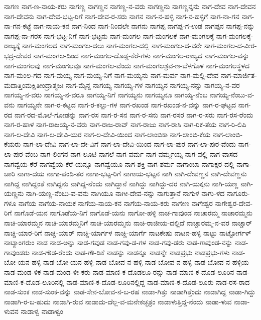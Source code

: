ನಾಗಣ
ನಾಗ-ಣ-ನಾಯ-ಕರು
ನಾಗಣ್ಣ
ನಾಗಣ್ಣನ
ನಾಗಣ್ಣ-ನ-ವರು
ನಾಗಣ್ಣನು
ನಾಗಣ್ಣನ್ನನು
ನಾಗ-ದೇವ
ನಾಗ-ದೇವನ
ನಾಗ-ದೇವನು
ನಾಗ-ದೇವ-ಭಟ್ಟ-ರಿಗೆ
ನಾಗ-ದೇವ-ರ-ಸರು
ನಾಗನ
ನಾಗ-ನ-ಹಳ್ಳಿ
ನಾಗ-ನ-ಹಳ್ಳಿಗೆ
ನಾಗ-ನಾ-ಗನ
ನಾಗ-ನಾ-ಗನ-ಕಟ್ಟೆ
ನಾಗ-ನಾಯ-ಕನ
ನಾಗ-ನಿಂದ
ನಾಗ-ನಿಂದಲೇ
ನಾಗನು
ನಾಗಪ್ಪ
ನಾಗಪ್ಪ-ಗ-ಉಡ
ನಾಗಪ್ಪನ
ನಾಗಪ್ಪ-ನನ್ನು
ನಾಗಪ್ಪ-ನಾ-ಗರಸ
ನಾಗ-ಭಟ್ಟ-ನಿಗೆ
ನಾಗ-ಭಟ್ಟನು
ನಾಗ-ಮಂಗಲ
ನಾಗ-ಮಂಗಲಕೆ
ನಾಗ-ಮಂಗಲಕ್ಕೆ
ನಾಗ-ಮಂಗಲಕ್ಕೆ-ರಾಜ್ಯಕ್ಕೆ
ನಾಗ-ಮಂಗಲದ
ನಾಗ-ಮಂಗಲ-ದಲು
ನಾಗ-ಮಂಗಲ-ದಲ್ಲಿ
ನಾಗ-ಮಂಗಲ-ದ-ವರೇ
ನಾಗ-ಮಂಗಲ-ದ-ವೀರ-ಭದ್ರ-ದೇವರ
ನಾಗ-ಮಂಗಲ-ದಿಂದ
ನಾಗ-ಮಂಗಲ-ದೊಡ್ಡ-ಕೆರೆ-ಗಳು
ನಾಗ-ಮಂಗಲ-ರಾಜ್ಯದ
ನಾಗ-ಮಂಗಲ-ವನ್ನು
ನಾಗ-ಮಂಗಲವು
ನಾಗ-ಮಂಗಲವೂ
ನಾಗ-ಮಂಗಲ-ವೆಂದು
ನಾಗ-ಮಂಗಲಶ್ರವ-ಣ-ಬೆಳಗೊಳ
ನಾಗ-ಮಂಗಲಸ್ಥಳದ
ನಾಗ-ಮಂಲ-ಗದ
ನಾಗ-ಮಯ್ಯ
ನಾಗ-ಮಯ್ಯ-ನಿಗೆ
ನಾಗ-ಮಯ್ಯನು
ನಾಗ-ಮರ್ವ
ನಾಗ-ಮಲ್ಲಿ-ದೇವ
ನಾಗ-ಮಾರ್ಜಿತ-ಮದಾತ್ತಿಂಮಕ್ಷಿತೀಂದ್ರಾತ್ಮಜಃ
ನಾಗ-ಮೈನ್ದ
ನಾಗಯ್ಯ
ನಾಗಯ್ಯ-ಗಳ
ನಾಗಯ್ಯನ
ನಾಗಯ್ಯ-ನನ್ನು
ನಾಗಯ್ಯ-ನ-ವರ
ನಾಗಯ್ಯ-ನ-ವರು
ನಾಗಯ್ಯ-ನ-ವರೂ
ನಾಗಯ್ಯ-ನಿಗೆ
ನಾಗಯ್ಯನು
ನಾಗಯ್ಯನೂ
ನಾಗಯ್ಯ-ನೆಂಬ
ನಾಗಯ್ಯ-ನೆಂಬು-ವ-ವನು
ನಾಗಯ್ಯನೇ
ನಾಗ-ರ-ಕಟ್ಟದ
ನಾಗ-ರ-ಕಲ್ಲು-ಗಳ
ನಾಗ-ರಖಂಡ
ನಾಗ-ರಖಂಡ-ನ-ವನ್ನು
ನಾಗ-ರ-ಘಟ್ಟದ
ನಾಗ-ರದ
ನಾಗ-ರದ-ಮೊಲೆ-ಗೋಡನ್ನು
ನಾಗ-ರಸ
ನಾಗ-ರ-ಸನ
ನಾಗ-ರ-ಸನು
ನಾಗ-ರಸರ
ನಾಗ-ರ-ಸರು
ನಾಗ-ರಸ-ರೆಂದು
ನಾಗ-ರ-ಹಾಳ
ನಾಗ-ರಾಜಯ್ಯ-ನ-ವರು
ನಾಗ-ರಾಜ-ರಾವ್
ನಾಗ-ರಾಜು
ನಾಗ-ರಾಸಿ
ನಾಗ-ರಿಕ-ತೆಯ
ನಾಗ-ರಿ-ಲಿಪಿ
ನಾಗ-ಲ-ದೇವಿ
ನಾಗ-ಲ-ದೇವಿ-ಯರ
ನಾಗ-ಲ-ದೇವಿ-ಯಿಂದ
ನಾಗ-ಲಾಂಬಿಕಾ
ನಾಗ-ಲಾಂಬಿ-ಕೆಯ
ನಾಗ-ಲಾಂಬಿ-ಕೆಯರು
ನಾಗ-ಲಾ-ದೇವಿ
ನಾಗ-ಲಾ-ದೇ-ವಿಗೆ
ನಾಗ-ಲಾ-ದೇವಿ-ಯಿಂದ
ನಾಗ-ಲಾ-ಪುರ
ನಾಗ-ಲಾ-ಪುರ-ವೆಂದು
ನಾಗ-ಲಾ-ಪುರ-ವೆಂಬ
ನಾಗ-ಲಿಂಗನ
ನಾಗ-ಲೂಟಿ
ನಾಗಲೆ
ನಾಗ-ವರ್ಮ
ನಾಗ-ವರ್ಮ್ಮಯ್ಯ
ನಾಗ-ವಲ್ಲಿ
ನಾಗ-ವಾಸದ
ನಾಗವ್ವೆಯ-ಕೆರೆ
ನಾಗವ್ವೆಯ-ಕೆರೆ-ಯನ್ನೂ
ನಾಗವ್ವೆಯೂ
ನಾಗ-ಶಕ್ತಿ
ನಾಗ-ಶರ್ಮ
ನಾಗಾಂಬಾ
ನಾಗಾಕ್ಷರ-ದಲ್ಲಿ
ನಾಗಾ-ಚಾರಿ
ನಾಗಾ-ದಯ
ನಾಗಾ-ಪಂಡಿ-ತರ
ನಾಗಾ-ಭಟ್ಟ-ರಿಗೆ
ನಾಗಾಯ-ಭಟ್ಟನ
ನಾಗಿ
ನಾಗಿ-ದೇವಣ್ಣನ
ನಾಗಿ-ದೇವಣ್ಣನು
ನಾಗಿದ್ದ
ನಾಗಿದ್ದಂತೆ
ನಾಗಿದ್ದನು
ನಾಗಿದ್ದ-ನೆಂದು
ನಾಗಿದ್ದಾನೆ
ನಾಗಿದ್ದು
ನಾಗಿದ್ದು-ದರ
ನಾಗಿ-ಯಕ್ಕನು
ನಾಗಿ-ಯಣ್ಣ
ನಾಗಿ-ಯಣ್ಣನು
ನಾಗಿ-ಯಣ್ಣ-ನೆಂಬು-ವ-ವನು
ನಾಗಿಯೂ
ನಾಗೀ-ದೇವ-ನನ್ನು
ನಾಗುತ್ತಾನೆ
ನಾಗುಳ
ನಾಗು-ಳದ
ನಾಗೂರು-ಗಳೂ
ನಾಗೆಯ
ನಾಗೆಯ-ನಾಯಕ
ನಾಗೆಯ-ನಾಯ-ಕನ
ನಾಗೆಯ-ನಾಯ-ಕರು
ನಾಗೇಣ
ನಾಗೇಶ್ವರ
ನಾಗೇಶ್ವರ-ದೇವ-ರಿಗೆ
ನಾಗೊಡೆ-ಯನ
ನಾಗೊಡೆಯ-ನಿಗೆ
ನಾಗೊಡೆ-ಯನು
ನಾಗೋ-ಹಳ್ಳಿ
ನಾಚ-ಗಾವುಂಡ
ನಾಚಾರಮ್ಮ
ನಾಚಾರಮ್ಮನು
ನಾಚಿ-ಯಾರಮ್ಮನ
ನಾಚಿ-ಯಾರಮ್ಮನಿಗೆ
ನಾಚಿ-ಯಾರಮ್ಮನು
ನಾಚಿ-ರಾಜೀಯ-ದಲ್ಲಿದೆ
ನಾಚ್ಚಾರಮ್ಮ-ನ-ವರ
ನಾಚ್ಚಾರ್
ನಾಚ್ಚಿ-ಯಾರ-ರಿಗೆ
ನಾಚ್ಚಿ-ಯಾರ್
ನಾಚ್ಚಿ-ಯಾರ್ಗಳ
ನಾಚ್ಚಿ-ಯಾರ್ಗೆ
ನಾಟಕೇಷು
ನಾಟನ-ಹಳ್ಳಿ
ನಾಟ್ಟು
ನಾಟ್ಟೋರ್ಗಳ್
ನಾಟ್ಯಾಂಗರುಂ
ನಾಡ
ನಾಡ-ಅನ್ನು
ನಾಡ-ಗವುಡ
ನಾಡ-ಗವು-ಡ-ಗಳ
ನಾಡ-ಗವು-ಡರು
ನಾಡ-ಗಾವುಂಡ-ನನ್ನು
ನಾಡ-ಗಾವುಂಡರು
ನಾಡ-ಗೌಡ-ರೆಂದು
ನಾಡ-ಗೌ-ಡಿಕೆ
ನಾಡನ್ನು
ನಾಡನ್ನೂ
ನಾಡನ್ನೇ
ನಾಡಪ್ರಭು
ನಾಡಪ್ರಭು-ಗಳು
ನಾಡ-ಬೋ-ಯನ-ಹಳ್ಳಿ
ನಾಡ-ಬೋ-ಯನ-ಹಳ್ಳಿ-ನಾಡ-ಬೋವ-ನ-ಹಳ್ಳಿ
ನಾಡ-ಬೋವ-ನ-ಹಳ್ಳಿ
ನಾಡ-ಬೋವ-ನ-ಹಳ್ಳಿಯ
ನಾಡ-ಮಂಡ-ಳಿಕ
ನಾಡ-ಮಂಡ-ಳೀ-ಕರು
ನಾಡ-ಮಾಣಿ-ಕ-ದೊಡಲೂ-ರನ್ನು
ನಾಡ-ಮಾಣಿ-ಕ-ದೊಡ-ಲೂರಿನ
ನಾಡ-ಮಾಣಿ-ಕ-ದೊಡ-ಲೂರಿನಲ್ಲಿ
ನಾಡ-ಮಾಣಿ-ಕ-ದೊಡ-ಲೂರಿನಲ್ಲಿದ್ದ
ನಾಡ-ಮಾಣಿ-ಕ-ದೊಡ-ಲೂರು
ನಾಡ-ರಸ-ರಾದ
ನಾಡ-ಸುಂಕ
ನಾಡ-ಸುಂಕ-ವನ್ನು
ನಾಡ-ಸೇನ-ಬೋವ-ನ-ಬ-ರಹ
ನಾಡಾ-ಗಿತ್ತು
ನಾಡಾಗಿತ್ತೆಂದು
ನಾಡಾಗಿದ್ದ
ನಾಡಾ-ಗಿದ್ದು
ನಾಡಾಗಿ-ರ-ಬ-ಹುದು
ನಾಡಾಗಿ-ರುವ
ನಾಡಾದು-ದೆಲ್ಲ-ವ-ಮನೇಕಚ್ಛತ್ರಂ
ನಾಡಾಳುತ್ತಿದ್ದ-ನೆಂದು
ನಾಡಾ-ಳುವ
ನಾಡಾ-ಳುವನ
ನಾಡಾಳ್ವ
ನಾಡಾಳ್ವಂ
